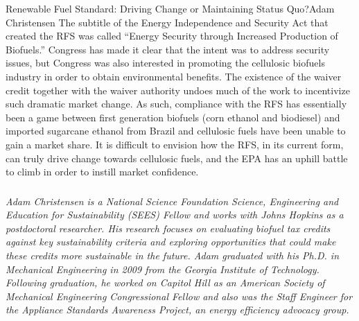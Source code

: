 \documentclass{papertex}
\begin{document}
\begin{news}{2}{Renewable Fuel Standard: Driving Change or Maintaining Status 
    Quo?}{Adam Christensen}{}{}
The subtitle of the Energy Independence and Security Act that created the RFS 
was called “Energy Security through Increased Production of Biofuels.” Congress 
has made it clear that the intent was to address security issues, but Congress 
was also interested in promoting the cellulosic biofuels industry in order to 
obtain environmental benefits. The existence of the waiver credit together 
with the waiver authority undoes much of the work to incentivize such dramatic 
market change. As such, compliance with the RFS has essentially been a game 
between first generation biofuels (corn ethanol and biodiesel) and imported 
sugarcane ethanol from Brazil and cellulosic fuels have been unable to gain a 
market share. It is difficult to envision how the RFS, in its current form, 
can truly drive change towards cellulosic fuels, and the EPA has an uphill 
battle to climb in order to instill market confidence.

\subsubsection*{}

\emph{Adam Christensen is a National Science Foundation Science, Engineering 
and Education for Sustainability (SEES) Fellow and works with Johns Hopkins 
as a postdoctoral researcher. His research focuses on evaluating biofuel tax 
credits against key sustainability criteria and exploring opportunities that 
could make these credits more sustainable in the future. Adam graduated with 
his Ph.D. in Mechanical Engineering in 2009 from the Georgia Institute of 
Technology. Following graduation, he worked on Capitol Hill as an American 
Society of Mechanical Engineering Congressional Fellow and also was the Staff 
Engineer for the Appliance Standards Awareness Project, an energy efficiency 
advocacy group.}

\end{news}
\end{document}
